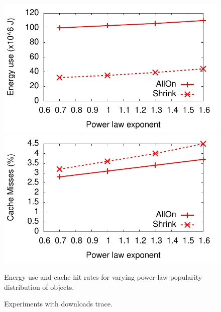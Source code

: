 \begin{figure}[tbp]
\includegraphics[scale=0.55]{energy/graphs/dummy/g7_popularity/popularity-energy.pdf}
\includegraphics[scale=0.55]{energy/graphs/dummy/g7_popularity/popularity-missrate.pdf}
\caption{Energy use and cache hit rates for varying power-law popularity distribution of objects.}
\end{figure}

\begin{figure}[tbp]
\vspace{1.5in}
\caption{Experiments with downloads trace.}
\end{figure}




